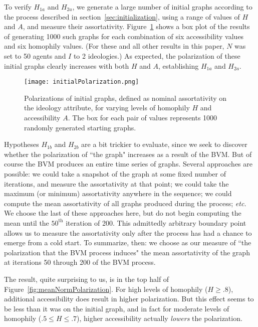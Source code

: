 
To verify $H_{1a}$ and $H_{2a}$, we generate a large number of initial graphs
according to the process described in section~\ref{sec:initialization}, using
a range of values of $H$ and $A$, and measure their assortativity.
Figure~\ref{fig:initialPolarization} shows a box plot of the results of
generating 1000 such graphs for each combination of six accessibility values
and six homophily values. (For these and all other results in this paper, $N$
was set to 50 agents and $I$ to 2 ideologies.) As expected, the polarization
of these initial graphs clearly increases with both $H$ and $A$, establishing
$H_{1a}$ and $H_{2a}$.

\begin{figure}
\centering
\texttt{[image: initialPolarization.png]}
\caption{Polarizations of initial graphs, defined as nominal assortativity on
the ideology attribute, for varying levels of homophily $H$ and accessibility
$A$. The box for each pair of values represents 1000 randomly generated
starting graphs.}
\label{fig:initialPolarization}
\end{figure}


Hypotheses $H_{1b}$ and $H_{2b}$ are a bit trickier to evaluate, since we seek
to discover whether the polarization of ``the graph" increases as a result
of the BVM. But of course the BVM produces an entire time series of graphs.
Several approaches are possible: we could take a snapshot of the graph at some
fixed number of iterations, and measure the assortativity at that point; we
could take the maximum (or minimum) assortativity anywhere in the sequence; we
could compute the mean assortativity of all graphs produced during the
process; \textit{etc.} We choose the last of these approaches here, but do not
begin computing the mean until the $50^{\text{th}}$ iteration of 200. This
admittedly arbitrary boundary point allows us to measure the assortativity
only after the process has had a chance to emerge from a cold start. To
summarize, then: we choose as our measure of ``the polarization that the BVM
process induces" the mean assortativity of the graph at iterations 50 through
200 of the BVM process.

The result, quite surprising to us, is in the top half of
Figure~\ref{fig:meanNormPolarization}. For high levels of homophily
($H\geq.8$), additional accessibility does result in higher polarization. But
this effect seems to be less than it was on the initial graph, and in fact for
moderate levels of homophily ($.5 \leq H \leq .7$), higher accessibility
actually \textit{lowers} the polarization. 

